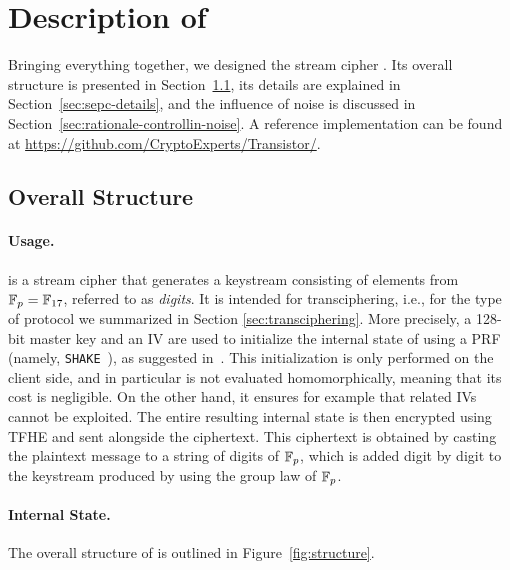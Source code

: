 \section{Description of \coolName}
\label{sec:description}


Bringing everything together, we designed the stream cipher \coolName{}.
Its overall structure is presented in Section~\ref{sec:description-structure}, its details are explained in Section~\ref{sec:sepc-details}, and the influence of noise is discussed in Section~\ref{sec:rationale-controllin-noise}. A reference implementation can be found at \url{https://github.com/CryptoExperts/Transistor/}.

\subsection{Overall Structure}
\label{sec:description-structure}


\paragraph{Usage.}
\label{sec:usage}

\coolName{} is a stream cipher that generates a keystream consisting of elements from \( \mathbb{F}_{p} = \mathbb{F}_{17} \), referred to as {\em digits}.  It is intended for transciphering, i.e., for the type of protocol we summarized in Section \ref{sec:transciphering}.
More precisely, a 128-bit master key and an IV are used to initialize the internal state of \coolName{} using  a PRF (namely, {\tt SHAKE}~\cite{sha-3}), as suggested in~\cite{FSE:BerGil07}. This initialization  is only performed on the client side, and in particular is not evaluated homomorphically, meaning that its cost is negligible. On the other hand, it ensures for example that related IVs cannot be exploited. The entire resulting internal state is then encrypted using TFHE and sent alongside the ciphertext. This ciphertext is obtained by casting the plaintext message to a string of digits of $\mathbb{F}_{p}$, which is added digit by digit to the keystream produced by \coolName{} using the group law of $\mathbb{F}_{p}$.



\paragraph{Internal State.}
The overall structure of \coolName{} is outlined in Figure~\ref{fig:structure}.

